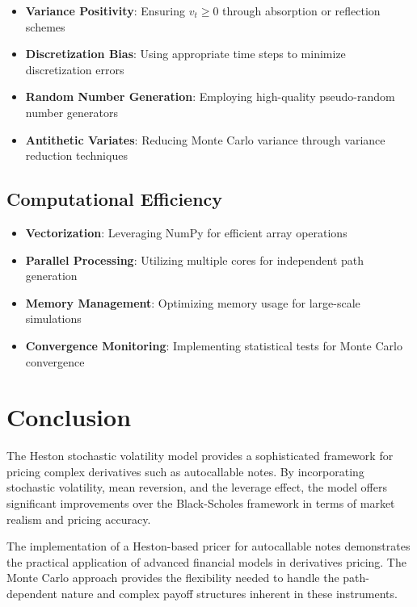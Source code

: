 \documentclass[12pt,a4paper]{article}
\begin{document}
\begin{itemize}
    \item \textbf{Variance Positivity}: Ensuring $v_t \geq 0$ through absorption or reflection schemes
    \item \textbf{Discretization Bias}: Using appropriate time steps to minimize discretization errors
    \item \textbf{Random Number Generation}: Employing high-quality pseudo-random number generators
    \item \textbf{Antithetic Variates}: Reducing Monte Carlo variance through variance reduction techniques
\end{itemize}

\subsection{Computational Efficiency}

\begin{itemize}
    \item \textbf{Vectorization}: Leveraging NumPy for efficient array operations
    \item \textbf{Parallel Processing}: Utilizing multiple cores for independent path generation
    \item \textbf{Memory Management}: Optimizing memory usage for large-scale simulations
    \item \textbf{Convergence Monitoring}: Implementing statistical tests for Monte Carlo convergence
\end{itemize}

\section{Conclusion}

The Heston stochastic volatility model provides a sophisticated framework for pricing complex derivatives such as autocallable notes. By incorporating stochastic volatility, mean reversion, and the leverage effect, the model offers significant improvements over the Black-Scholes framework in terms of market realism and pricing accuracy.

The implementation of a Heston-based pricer for autocallable notes demonstrates the practical application of advanced financial models in derivatives pricing. The Monte Carlo approach provides the flexibility needed to handle the path-dependent nature and complex payoff structures inherent in these instruments.
\end{document}
